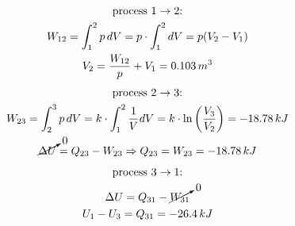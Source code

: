 \documentclass[11pt, a4paper]{article}
\begin{document}
\begin{gather}
  \text{process $1 \to 2$:} \notag\\
  W_{12} = \int_1^2 p\,dV = p\cdot \int_1^2 dV = p(V_2 - V_1)\\
  V_2 = \frac{W_{12}}{p} + V_1 = 0.103\,m^3
\end{gather}
\begin{gather}
  \text{process $2 \to 3$:} \notag\\
  W_{23} = \int_2^3 p\,dV = k \cdot \int_1^2 \frac{1}{V}dV = k\cdot \ln\left(\frac{V_3}{V_2} \right) = -18.78\,kJ\\
  \cancelto{0}{\Delta U} = Q_{23} - W_{23} \Rightarrow Q_{23} = W_{23} = -18.78\,kJ
\end{gather}
\begin{gather}
  \text{process $3 \to 1$:} \notag\\
  \Delta U = Q_{31} - \cancelto{0}{W_{31}}\\
  U_1 - U_3 = Q_{31} = -26.4\,kJ
\end{gather}
\end{document}
